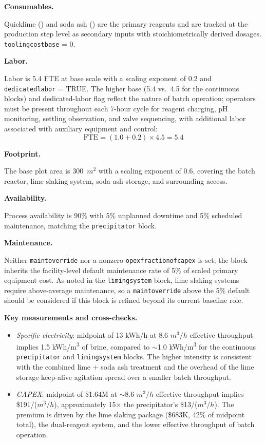\documentclass{article}
\renewcommand\_{\textunderscore\allowbreak}
\begin{document}
\medskip
\noindent\textbf{Consumables.}\quad

Quicklime () and soda ash () are the primary reagents and are tracked at the production step level as secondary inputs with stoichiometrically derived dosages. \texttt{tooling\_cost\_base} = 0.

\medskip
\noindent\textbf{Labor.}\quad

Labor is 5.4 FTE at base scale with a scaling exponent of 0.2 and \texttt{dedicated\_labor} = TRUE. The higher base (5.4 vs.\ 4.5 for the continuous blocks) and dedicated-labor flag reflect the nature of batch operation; operators must be present throughout each 7-hour cycle for reagent charging, pH monitoring, settling observation, and valve sequencing, with additional labor associated with auxiliary equipment and control:
\[
	\text{FTE} = (1.0 + 0.2) \times 4.5 = 5.4
\]

\medskip
\noindent\textbf{Footprint.}\quad

The base plot area is 300~$\si{m^2}$ with a scaling exponent of 0.6, covering the batch reactor, lime slaking system, soda ash storage, and surrounding access.

\medskip
\noindent\textbf{Availability.}\quad

Process availability is 90\% with 5\% unplanned downtime and 5\% scheduled maintenance, matching the \texttt{precipitator} block.

\medskip
\noindent\textbf{Maintenance.}\quad

Neither \texttt{maint\_override} nor a nonzero \texttt{opex\_fraction\_of\_capex} is set; the block inherits the facility-level default maintenance rate of 5\% of scaled primary equipment cost. As noted in the \texttt{liming\_system} block, lime slaking systems require above-average maintenance, so a \texttt{maint\_override} above the 5\% default should be considered if this block is refined beyond its current baseline role.

\medskip
\noindent\textbf{Key measurements and cross-checks.}\quad

\begin{itemize}[noitemsep]
	\item \textit{Specific electricity}: midpoint of 13 kWh/h at 8.6 $\si{m^3/h}$ effective throughput implies 1.5 \si{kWh/m^3} of brine, compared to $\sim$1.0 \si{kWh/m^3} for the continuous \texttt{precipitator} and \texttt{liming\_system} blocks. The higher intensity is consistent with the combined lime + soda ash treatment and the overhead of the lime storage keep-alive agitation spread over a smaller batch throughput.
	\item \textit{CAPEX}: midpoint of \$1.64M at $\sim$8.6 $\si{m^3/h}$ effective throughput implies \$191/($\si{m^3/h}$), approximately 15$\times$ the precipitator's \$13/($\si{m^3/h}$). The premium is driven by the lime slaking package (\$683K, 42\% of midpoint total), the dual-reagent system, and the lower effective throughput of batch operation.
\end{itemize}
\end{document}
